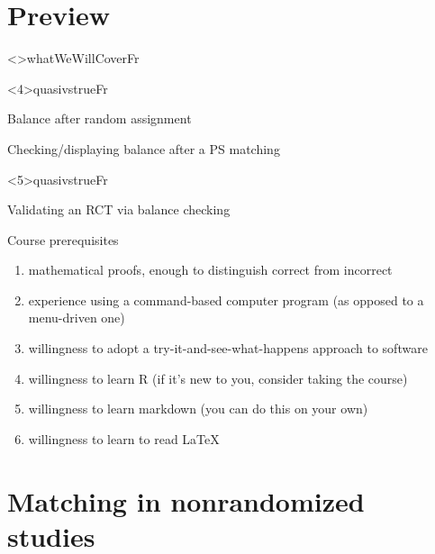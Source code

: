 \section*{Preview}
\againframe<\nottheirhandout>{whatWeWillCoverFr}

\againframe<4\mynoteonly>{quasivstrueFr}

\begin{frame}{Balance after random assignment}
  \begin{center}
  \end{center}
\end{frame}

\begin{frame}{Checking/displaying balance after a PS matching}
  \begin{center}
  \end{center}
\end{frame}


\againframe<5\mynoteonly>{quasivstrueFr}

\begin{frame}{Validating an RCT via balance checking}
  \begin{center}
  \end{center}
\end{frame}

\begin{frame}{Course prerequisites}
  \begin{enumerate}
  \item mathematical proofs, enough to distinguish correct from incorrect 
\item experience using a command-based computer program (as opposed to a menu-driven one)
\item willingness to adopt a try-it-and-see-what-happens approach to software
\item willingness to learn R  (if it's new to you, consider taking the course)
\item willingness to learn markdown (you can do this on your own)
\item willingness to learn to read LaTeX

  \end{enumerate}
\end{frame}


\section{Matching in nonrandomized studies}

